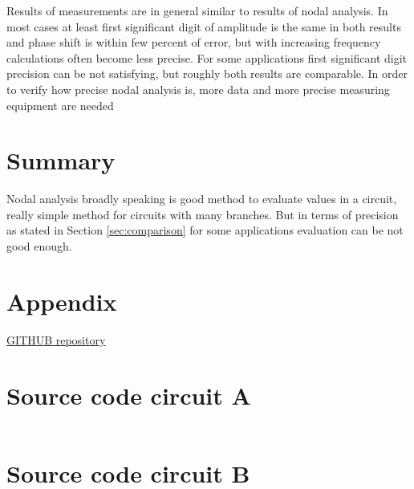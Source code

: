 \documentclass[notitlepage, a4paper, 11pt]{article}
\begin{document}
	Results of measurements are in general similar to results of nodal analysis. In most cases at least first significant digit of amplitude is the same in both results and phase shift is within few percent of error, but with increasing frequency calculations often become less precise. For some applications first significant digit precision can be not satisfying, but roughly both results are comparable. In order to verify how precise nodal analysis is, more data and more precise measuring equipment are needed
	\section{Summary}
	Nodal analysis broadly speaking is good method to evaluate values in a circuit, really simple method for circuits with many branches. But in terms of precision as stated in Section \ref{sec:comparison} for some applications evaluation can be not good enough. 
	\newpage
	\appendix
	\section*{Appendix}\label{Appendix}
	\href{https://github.com/kamilix2003/CT-labs}{GITHUB repository}
	\section{Source code circuit A}
	\inputminted{python}{../CircuitA.py}
	\label{code:A}
	\newpage
	\section{Source code circuit B}
	\inputminted{python}{../CircuitB.py}
	\label{code:B}
\end{document}
